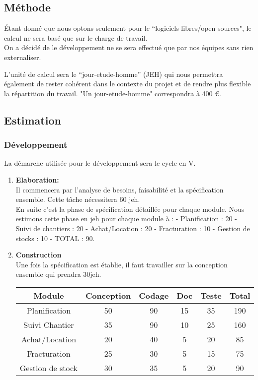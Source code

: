 \begin{description}
\subsection{Méthode}

Étant donné que nous optons seulement pour le ``logiciels libres/open sources", le calcul ne sera basé que sur le charge de travail.\\

On a décidé de le développement ne se sera effectué que par nos équipes sans rien externaliser.

L’unité de calcul sera le ``jour-etude-homme'' (JEH) qui nous permettra également de rester cohérent dans le contexte du projet et de rendre plus flexible la répartition du travail. "Un jour-etude-homme" correspondra à 400 €.

\subsection{Estimation}

\subsubsection{Développement}
La démarche utilisée pour le développement sera le cycle en V. 

\begin{enumerate}
\item \textbf{Elaboration:}\\ Il commencera par l'analyse de besoins, faisabilité et la spécification ensemble. Cette tâche nécessitera  60 jeh. \\

En suite c'est la phase de spécification détaillée pour chaque module. Nous estimons cette phase en jeh pour chaque module à :
     - Planification : 20
     - Suivi de chantiers : 20 
     - Achat/Location : 20 
     - Fracturation : 10
     - Gestion de stocks : 10 
     - TOTAL : 90.

\item \textbf{Construction}\\
Une fois la spécification est établie, il faut travailler sur la conception ensemble qui prendra 30jeh. 

\begin{center} 
    \begin{tabular}{ |c| c| c | c | c |c |}
    \hline
	 Module&Conception&Codage&Doc&Teste&Total\\ \hline
    Planification & 50 & 90 & 15 &35&190\\ \hline
    Suivi Chantier &35&90&10&25&160 \\ \hline
    Achat/Location &20&40&5&20&85  \\ \hline
    Fracturation &25&30&5&15&75\\ \hline
    Gestion de stock &30&35&5&20&90 \\
    \hline
    \end{tabular}
\end{center}


\end{enumerate}
\end{description}
